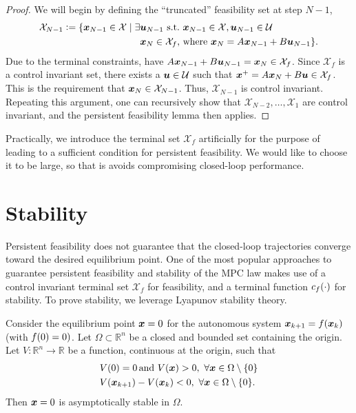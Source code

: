 \begin{proof}
We will begin by defining the ``truncated'' feasibility set at step $N-1$,
\begin{align}
    \mathcal{X}_{N-1} \vcentcolon= \{\bm{x}_{N-1} \in \mathcal{X} \mid \exists & \bm{u}_{N-1} \,\,\text{s.t.}\,\, \bm{x}_{N-1} \in \mathcal{X}, \bm{u}_{N-1} \in \mathcal{U}\\
    & \bm{x}_N \in \mathcal{X}_f, \,\text{where}\,\, \bm{x}_N = A \bm{x}_{N-1} + B \bm{u}_{N-1} \nonumber
    \}.
\end{align}
Due to the terminal constraints, have $A \bm{x}_{N-1} + B \bm{u}_{N-1} = \bm{x}_N \in \mathcal{X}_f$. Since $\mathcal{X}_f$ is a control invariant set, there exists a $\bm{u} \in \mathcal{U}$ such that $\bm{x}^+ = A \bm{x}_N + B \bm{u} \in \mathcal{X}_f$. This is the requirement that $\bm{x}_N \in \mathcal{X}_{N-1}$. Thus, $\mathcal{X}_{N-1}$ is control invariant. Repeating this argument, one can recursively show that $\mathcal{X}_{N-2}, \ldots, \mathcal{X}_1$ are control invariant, and the persistent feasibility lemma then applies. 
\end{proof}

Practically, we introduce the terminal set $\mathcal{X}_f$ artificially for the purpose of leading to a sufficient condition for persistent feasibility. We would like to choose it to be large, so that is avoids compromising closed-loop performance. 

\section{Stability}

Persistent feasibility does not guarantee that the closed-loop trajectories converge toward the desired equilibrium point. One of the most popular approaches to guarantee persistent feasibility and stability of the MPC law makes use of a control invariant terminal set $\mathcal{X}_f$ for feasibility, and a terminal function $c_f(\cdot)$ for stability. To prove stability, we leverage Lyapunov stability theory. 

\begin{theorem}
\label{thm:mpc_stability}
Consider the equilibrium point $\bm{x} = 0$ for the autonomous system $\bm{x}_{k+1} = f(\bm{x}_k)$ (with $f(0)=0)$. Let $\Omega \subset \mathbb{R}^n$ be a closed and bounded set containing the origin. Let $V:\mathbb{R}^n \to \mathbb{R}$ be a function, continuous at the origin, such that 
\begin{align}
    & V(0) = 0\, \text{and} \,\,V(\bm{x}) > 0, \,\, \forall \bm{x} \in \Omega \setminus \{0\} \\
    & V(\bm{x}_{k+1}) - V(\bm{x}_k) < 0, \,\, \forall \bm{x} \in \Omega \setminus \{0\}.
\end{align}
Then $\bm{x}=0$ is asymptotically stable in $\Omega$.
\end{theorem}

